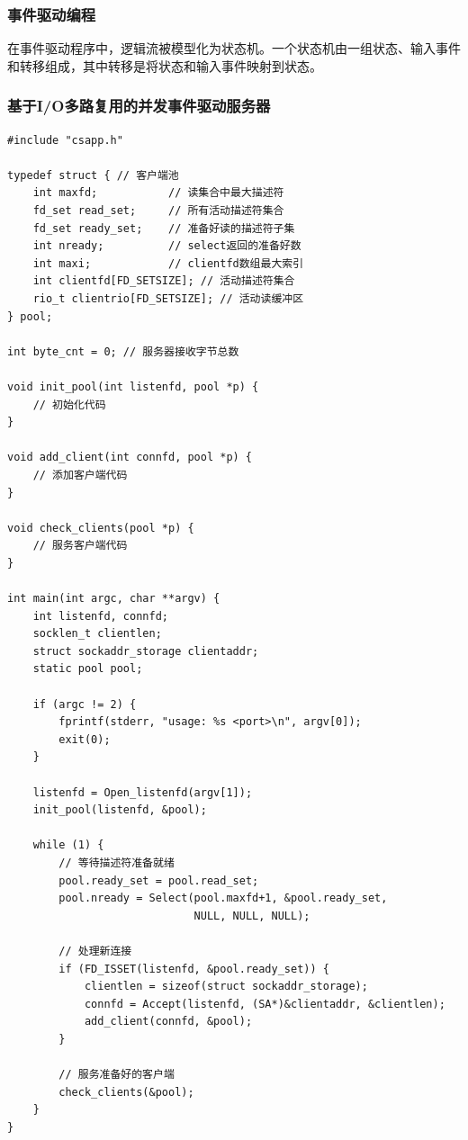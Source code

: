 \subsubsection{事件驱动编程}
在事件驱动程序中，逻辑流被模型化为状态机。一个状态机由一组状态、输入事件和转移组成，其中转移是将状态和输入事件映射到状态。

\subsubsection{基于I/O多路复用的并发事件驱动服务器}
\begin{lstlisting}[style=CStyle]
#include "csapp.h"

typedef struct { // 客户端池
    int maxfd;           // 读集合中最大描述符
    fd_set read_set;     // 所有活动描述符集合
    fd_set ready_set;    // 准备好读的描述符子集
    int nready;          // select返回的准备好数
    int maxi;            // clientfd数组最大索引
    int clientfd[FD_SETSIZE]; // 活动描述符集合
    rio_t clientrio[FD_SETSIZE]; // 活动读缓冲区
} pool;

int byte_cnt = 0; // 服务器接收字节总数

void init_pool(int listenfd, pool *p) {
    // 初始化代码
}

void add_client(int connfd, pool *p) {
    // 添加客户端代码
}

void check_clients(pool *p) {
    // 服务客户端代码
}

int main(int argc, char **argv) {
    int listenfd, connfd;
    socklen_t clientlen;
    struct sockaddr_storage clientaddr;
    static pool pool;
    
    if (argc != 2) {
        fprintf(stderr, "usage: %s <port>\n", argv[0]);
        exit(0);
    }
    
    listenfd = Open_listenfd(argv[1]);
    init_pool(listenfd, &pool);
    
    while (1) {
        // 等待描述符准备就绪
        pool.ready_set = pool.read_set;
        pool.nready = Select(pool.maxfd+1, &pool.ready_set, 
                             NULL, NULL, NULL);
        
        // 处理新连接
        if (FD_ISSET(listenfd, &pool.ready_set)) {
            clientlen = sizeof(struct sockaddr_storage);
            connfd = Accept(listenfd, (SA*)&clientaddr, &clientlen);
            add_client(connfd, &pool);
        }
            
        // 服务准备好的客户端
        check_clients(&pool);
    }
}
\end{lstlisting}

